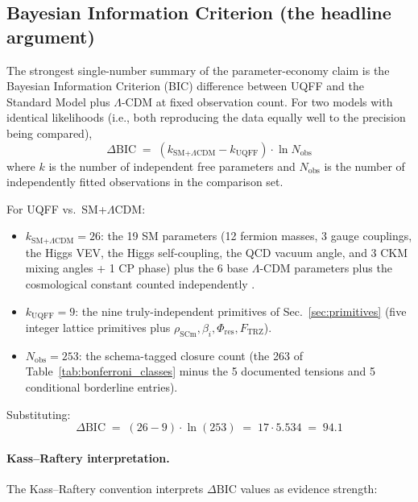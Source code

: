 \subsection{Bayesian Information Criterion (the headline argument)}
\label{sec:bic}

The strongest single-number summary of the parameter-economy claim
is the Bayesian Information Criterion (BIC) difference between
UQFF and the Standard Model plus $\Lambda$-CDM at fixed observation
count. For two models with identical likelihoods (i.e., both
reproducing the data equally well to the precision being compared),
\begin{equation}
\Delta\mathrm{BIC} \;=\; (k_{\text{SM+}\Lambda\text{CDM}} - k_{\text{UQFF}})\cdot\ln N_{\text{obs}}
\label{eq:bic_general}
\end{equation}
where $k$ is the number of independent free parameters and
$N_{\text{obs}}$ is the number of independently fitted observations
in the comparison set.

For UQFF vs.\ SM+$\Lambda$CDM:
\begin{itemize}
  \item $k_{\text{SM+}\Lambda\text{CDM}} = 26$: the 19 SM parameters
        (12 fermion masses, 3 gauge couplings, the Higgs VEV, the
        Higgs self-coupling, the QCD vacuum angle, and 3 CKM mixing
        angles + 1 CP phase) plus the 6 base $\Lambda$-CDM parameters
        plus the cosmological constant counted independently
        \cite{PDG2024, Planck2018}.
  \item $k_{\text{UQFF}} = 9$: the nine truly-independent primitives
        of Sec.~\ref{sec:primitives}
        (five integer lattice primitives plus
        $\rho_{\text{SCm}}, \beta_i, \Phi_{\text{res}}, F_{\text{TRZ}}$).
  \item $N_{\text{obs}} = 253$: the schema-tagged closure count
        (the 263 of Table~\ref{tab:bonferroni_classes} minus the 5
        documented tensions and 5 conditional borderline entries).
\end{itemize}

Substituting:
\begin{equation}
\boxed{\;
\Delta\mathrm{BIC} \;=\; (26 - 9)\cdot\ln(253)
\;=\; 17 \cdot 5.534
\;=\; 94.1
\;}
\label{eq:bic_uqff}
\end{equation}

\paragraph{Kass--Raftery interpretation.}
The Kass--Raftery convention \cite{KassRaftery1995} interprets
$\Delta\mathrm{BIC}$ values as evidence strength:

